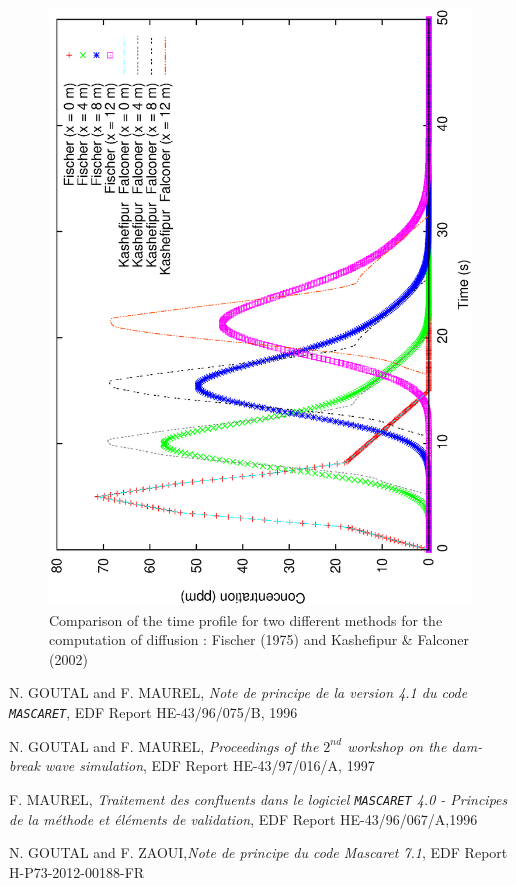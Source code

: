 \documentclass[a4paper,12pt]{article}
\begin{document}
\begin{figure}[h]
  \begin{center}
  \includegraphics[scale=0.5,angle=-90]{comp}
  \caption{Comparison of the time profile for two different methods for the computation of diffusion : Fischer (1975) and Kashefipur \& Falconer (2002)}
  \label{fig:Comparison}
  \end{center}
\end{figure}


\newpage
\begin{thebibliography}{1}

 N. GOUTAL and F. MAUREL, \emph{Note de principe de la version 4.1 du code \texttt{MASCARET}}, EDF Report HE-43/96/075/B, 1996

 N. GOUTAL and F. MAUREL, \emph{Proceedings of the $2^{nd}$ workshop on the dam-break wave simulation}, EDF Report HE-43/97/016/A, 1997

 F. MAUREL, \emph{Traitement des confluents dans le  logiciel \texttt{MASCARET} 4.0 - Principes de la m\'ethode et \'el\'ements de validation}, EDF Report HE-43/96/067/A,1996

 N. GOUTAL and F. ZAOUI,\emph{Note de principe du code Mascaret 7.1}, EDF Report H-P73-2012-00188-FR

\end{thebibliography}
\end{document}
